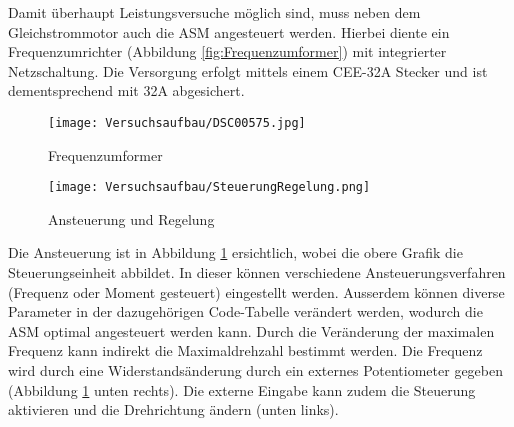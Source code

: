 Damit überhaupt Leistungsversuche möglich sind, muss neben dem Gleichstrommotor auch die ASM angesteuert werden. Hierbei diente ein Frequenzumrichter (Abbildung \ref{fig:Frequenzumformer}) mit integrierter Netzschaltung. Die Versorgung erfolgt mittels einem CEE-32A Stecker und ist dementsprechend mit 32A abgesichert.

\begin{figure}[H]
	\centering
	\begin{minipage}[h]{.4\linewidth} %
		\centering
		\texttt{[image: Versuchsaufbau/DSC00575.jpg]}
		\caption[Frequenzumformer]{Frequenzumformer}
		\label{fig:Frequenzumformer}
	\end{minipage}
	\quad %
	\begin{minipage}[h]{.4\linewidth} %
		\centering
		\texttt{[image: Versuchsaufbau/SteuerungRegelung.png]}
		\caption[Ansteuerung und Regelung]{Ansteuerung und Regelung}
		\label{fig:AnsteuerungRegelung}
	\end{minipage}
\end{figure}

 Die Ansteuerung ist in Abbildung \ref{fig:AnsteuerungRegelung} ersichtlich, wobei die obere Grafik die Steuerungseinheit abbildet. In dieser können verschiedene Ansteuerungsverfahren (Frequenz oder Moment gesteuert) eingestellt werden. Ausserdem können diverse Parameter in der dazugehörigen Code-Tabelle verändert werden, wodurch die ASM optimal angesteuert werden kann. Durch die Veränderung der maximalen Frequenz kann indirekt die Maximaldrehzahl bestimmt werden. Die Frequenz wird durch eine Widerstandsänderung durch ein externes Potentiometer gegeben (Abbildung \ref{fig:AnsteuerungRegelung} unten rechts). Die externe Eingabe kann zudem die Steuerung aktivieren und die Drehrichtung ändern (unten links).
